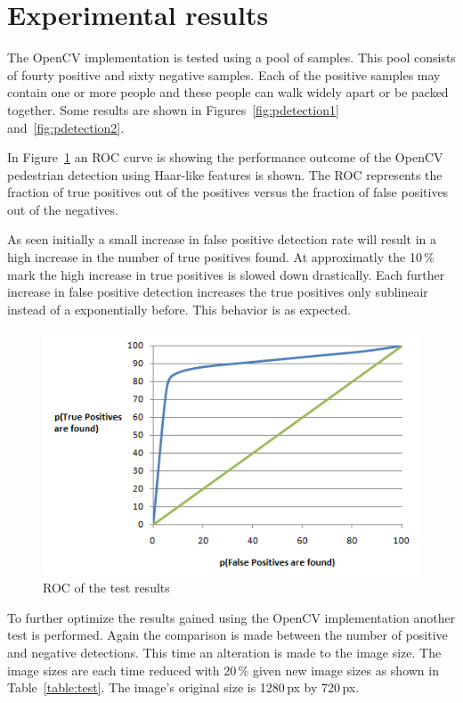 \documentclass{article}
\begin{document}
\section{Experimental results}
The OpenCV implementation is tested using a pool of samples. This pool consists of fourty positive and sixty negative samples. Each of the positive samples may contain one or more people and these people can walk widely apart or be packed together. Some results are shown in Figures~\ref{fig:pdetection1} and~\ref{fig:pdetection2}.
\par
In Figure~\ref{fig:roc} an ROC curve is showing the performance outcome of the OpenCV pedestrian detection using Haar-like features is shown. The ROC represents the fraction of true positives out of the positives versus the fraction of false positives out of the negatives.
\par
As seen initially a small increase in false positive detection rate will result in a high increase in the number of true positives found. At approximatly the 10\,\% mark the high increase in true positives is slowed down drastically. Each further increase in false positive detection increases the true positives only sublineair instead of a exponentially before. This behavior is as expected.
\begin{figure}[h!]
	\centering
	\includegraphics[scale=0.68]{roc.png}
	\caption{ROC of the test results}
	\label{fig:roc}
\end{figure}
\par
To further optimize the results gained using the OpenCV implementation another test is performed. Again the comparison is made between the number of positive and negative detections. This time an alteration is made to the image size. The image sizes are each time reduced with 20\,\% given new image sizes as shown in Table~\ref{table:test}. The image's original size is 1280\,px by 720\,px.
\end{document}
